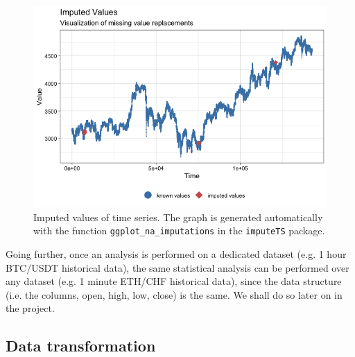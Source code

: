 \documentclass[twoside]{report}
\newcommand{\code}{\texttt}
\begin{document}
\begin{spacing}{1}
\begin{figure}[H]
    \centering
    \includegraphics[width=\linewidth]{Reddit_Analysis/Price_Data_Extraction/Data/Binance_OHLC/imputed_gg_1m.png}
    \caption{Imputed values of time series. The graph is generated automatically with the function \code{ggplot\_na\_imputations} in the \code{imputeTS} package.}
    \label{fig:imputations}
\end{figure}


Going further, once an analysis is performed on a dedicated dataset (e.g. 1 hour BTC/USDT historical data), the same statistical analysis can be performed over any dataset (e.g. 1 minute ETH/CHF historical data), since the data structure (i.e. the columns, open, high, low, close) is the same. We shall do so later on in the project.



\subsection{Data transformation}


\end{spacing}
\end{document}
